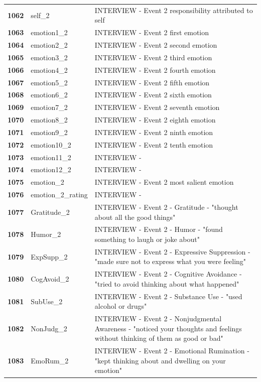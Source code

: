 \documentclass[
  letterpaper,
  DIV=11,
  numbers=noendperiod]{scrartcl}
\begin{document}
\begin{longtable}[t]{>{}cll}
\textbf{1062} & self\_2 & INTERVIEW - Event 2 responsibility attributed to self\\
\textbf{1063} & emotion1\_2 & INTERVIEW - Event 2 first emotion\\
\textbf{1064} & emotion2\_2 & INTERVIEW - Event 2 second emotion\\
\textbf{1065} & emotion3\_2 & INTERVIEW - Event 2 third emotion\\
\addlinespace
\textbf{1066} & emotion4\_2 & INTERVIEW - Event 2 fourth emotion\\
\textbf{1067} & emotion5\_2 & INTERVIEW - Event 2 fifth emotion\\
\textbf{1068} & emotion6\_2 & INTERVIEW - Event 2 sixth emotion\\
\textbf{1069} & emotion7\_2 & INTERVIEW - Event 2 seventh emotion\\
\textbf{1070} & emotion8\_2 & INTERVIEW - Event 2 eighth emotion\\
\addlinespace
\textbf{1071} & emotion9\_2 & INTERVIEW - Event 2 ninth emotion\\
\textbf{1072} & emotion10\_2 & INTERVIEW - Event 2 tenth emotion\\
\textbf{1073} & emotion11\_2 & INTERVIEW -\\
\textbf{1074} & emotion12\_2 & INTERVIEW -\\
\textbf{1075} & emotion\_2 & INTERVIEW - Event 2 most salient emotion\\
\addlinespace
\textbf{1076} & emotion\_2\_rating & INTERVIEW -\\
\textbf{1077} & Gratitude\_2 & INTERVIEW - Event 2 - Gratitude - "thought about all the good things"\\
\textbf{1078} & Humor\_2 & INTERVIEW - Event 2 - Humor - "found something to laugh or joke about"\\
\textbf{1079} & ExpSupp\_2 & INTERVIEW - Event 2 - Expressive Suppression - "made sure not to express what you were feeling"\\
\textbf{1080} & CogAvoid\_2 & INTERVIEW - Event 2 - Cognitive Avoidance - "tried to avoid thinking about what happened"\\
\addlinespace
\textbf{1081} & SubUse\_2 & INTERVIEW - Event 2 - Substance Use - "used alcohol or drugs"\\
\textbf{1082} & NonJudg\_2 & INTERVIEW - Event 2 - Nonjudgmental Awareness - "noticed your thoughts and feelings without thinking of them as good or bad"\\
\textbf{1083} & EmoRum\_2 & INTERVIEW - Event 2 - Emotional Rumination - "kept thinking about and dwelling on your emotion"\\

\end{longtable}
\end{document}
